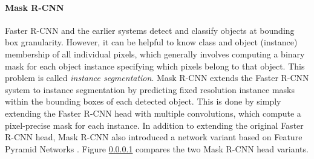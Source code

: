 \paragraph{Mask R-CNN}
Faster R-CNN and the earlier systems detect and classify objects at bounding box granularity.
However, it can be helpful to know class and object (instance) membership of all individual pixels,
which generally involves computing a binary mask for each object instance specifying which pixels belong
to that object. This problem is called \emph{instance segmentation}.
Mask R-CNN \cite{MaskRCNN} extends the Faster R-CNN system to instance segmentation by predicting
fixed resolution instance masks within the bounding boxes of each detected object.
This is done by simply extending the Faster R-CNN head with multiple convolutions, which
compute a pixel-precise mask for each instance.
In addition to extending the original Faster R-CNN head, Mask R-CNN also introduced a network
variant based on Feature Pyramid Networks \cite{FPN}.
Figure \ref{} compares the two Mask R-CNN head variants.

